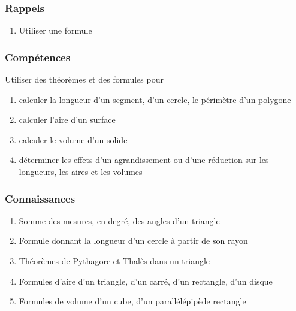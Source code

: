 \documentclass[12pt,a4paper]{article}
\begin{document}
	\subsubsection*{Rappels}
	\begin{enumerate}
		\item Utiliser une formule
	\end{enumerate}
	\subsubsection*{Compétences}
	Utiliser des théorèmes et des formules pour
	\begin{enumerate}
		\item calculer la longueur d'un segment, d'un cercle, le périmètre d'un polygone
		\item calculer l'aire d'un surface
		\item calculer le volume d'un solide
		\item déterminer les effets d'un agrandissement ou d'une réduction sur les longueurs, les aires et les volumes
	\end{enumerate}
	
	\subsubsection*{Connaissances}
	\begin{enumerate}
		\item Somme des mesures, en degré, des angles d'un triangle
		\item Formule donnant la longueur d'un cercle à partir de son rayon
		\item Théorèmes de Pythagore et Thalès dans un triangle
		\item Formules d'aire d'un triangle, d'un carré, d'un rectangle, d'un disque
		\item Formules de volume d'un cube, d'un parallélépipède rectangle
	\end{enumerate}
\end{document}
